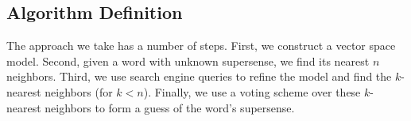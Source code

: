 \documentclass{article}
\begin{document}
\subsection{Algorithm Definition}
\label{sec:alg}


The approach we take has a number of steps.
First, we construct a vector space model.
Second, given a word with unknown supersense, we find its nearest $n$ neighbors.
Third, we use search engine queries to refine the model and find the $k$-nearest neighbors (for $k< n$).
Finally, we use a voting scheme over these $k$-nearest neighbors to form a guess of the word's supersense.
\end{document}
